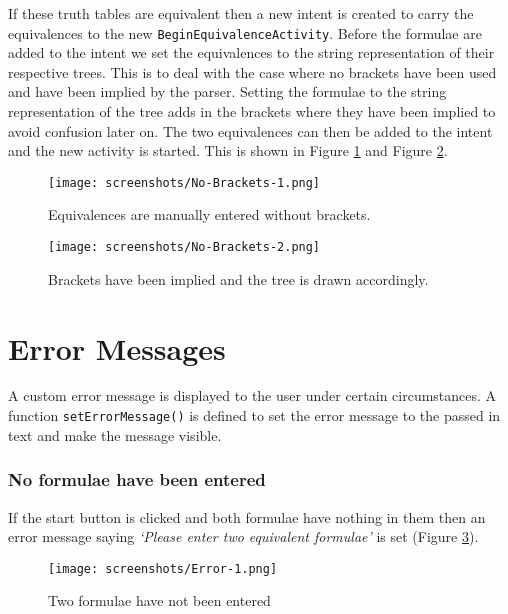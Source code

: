 \documentclass[draft]{report}
\begin{document}
If these truth tables are equivalent then a new intent is created to carry the equivalences to the new {\tt BeginEquivalenceActivity}. Before the formulae are added to the intent we set the equivalences to the string representation of their respective trees. This is to deal with the case where no brackets have been used and have been implied by the parser. Setting the formulae to the string representation of the tree adds in the brackets where they have been implied to avoid confusion later on. The two equivalences can then be added to the intent and the new activity is started. This is shown in Figure \ref{nobrackets1} and Figure \ref{nobrackets2}.

\begin{figure}[ht!]
    \centering
    \texttt{[image: screenshots/No-Brackets-1.png]}
    \caption{Equivalences are manually entered without brackets.}
    \label{nobrackets1}
\end{figure}

\begin{figure}[ht!]
    \centering
    \texttt{[image: screenshots/No-Brackets-2.png]}
    \caption{Brackets have been implied and the tree is drawn accordingly.}
    \label{nobrackets2}
\end{figure}

\section{Error Messages}
\label{error_messages}

A custom error message is displayed to the user under certain circumstances. A function {\tt setErrorMessage()} is defined to set the error message to the passed in text and make the message visible.

\subsubsection{No formulae have been entered}

If the start button is clicked and both formulae have nothing in them then an error message saying \textit{`Please enter two equivalent formulae'} is set (Figure \ref{error1}).

\begin{figure}[ht!]
    \centering
    \texttt{[image: screenshots/Error-1.png]}
    \caption{Two formulae have not been entered}
    \label{error1}
\end{figure}
\end{document}
